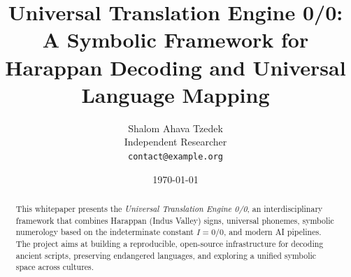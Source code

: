 \documentclass[11pt,a4paper]{article}
\title{Universal Translation Engine 0/0:\\
A Symbolic Framework for Harappan Decoding and Universal Language Mapping}
\author{Shalom Ahava Tzedek\\
\small Independent Researcher\\
\small \texttt{contact@example.org}} %
\date{\today}
\begin{document}
\maketitle

\begin{abstract}
This whitepaper presents the \emph{Universal Translation Engine 0/0}, 
an interdisciplinary framework that combines Harappan (Indus Valley) signs,
universal phonemes, symbolic numerology based on the indeterminate constant 
$I = 0/0$, and modern AI pipelines. The project aims at building a reproducible,
open-source infrastructure for decoding ancient scripts, preserving endangered
languages, and exploring a unified symbolic space across cultures.
\end{abstract}

\tableofcontents











\end{document}
